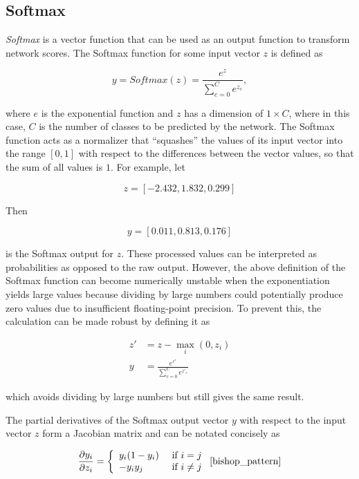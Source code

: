 	\subsection{Softmax}
\label{subsec:softmax}

\textit{Softmax} is a vector function that can be used as an output function to transform network scores. The Softmax function for some input vector $z$ is defined as

\[y = Softmax(z) = \frac{e^{z}}{\sum_{c=0}^{C} e^{z_c}},\]

\noindent where $e$ is the exponential function and $z$ has a dimension of $1 \times C$, where in this case, $C$ is the number of classes to be predicted by the network. The Softmax function acts as a normalizer that ``squashes'' the values of its input vector into the range $[0, 1]$ with respect to the differences between the vector values, so that the sum of all values is $1$. For example, let 

\[ z = [-2.432, 1.832, 0.299] \]

\noindent Then 

\[ y = [0.011, 0.813, 0.176] \]

\noindent is the Softmax output for $z$. These processed values can be interpreted as probabilities as opposed to the raw output. However, the above definition of the Softmax function can become numerically unstable when the exponentiation yields large values because dividing by large numbers could potentially produce zero values due to insufficient floating-point precision. To prevent this, the calculation can be made robust by defining it as

\begin {align}
	z' &= z - \max \limits_{i}(0, z_i)\\
	y &= \frac{e^{c'}}{\sum_{c=0}^{C} e^{z'_{{c}}}}
\end {align}

\noindent which avoids dividing by large numbers but still gives the same result. \cite[p. 81]{deeplearning_book}

The partial derivatives of the Softmax output vector $y$ with respect to the input vector $z$ form a Jacobian matrix and can be notated concisely as

\begin {align}
	\frac{\partial y_i}{\partial z_i} = \bigg \{ \begin {array}{ll}
								y_i(1 - y_i)& \text{ if } i = j \\
								-y_i y_j& \text{ if } i \neq j
							\end{array}
	\label{eq:softmax_deriv}\,\,\cite[\text{ p. 209}]{bishop_pattern}
\end {align}


